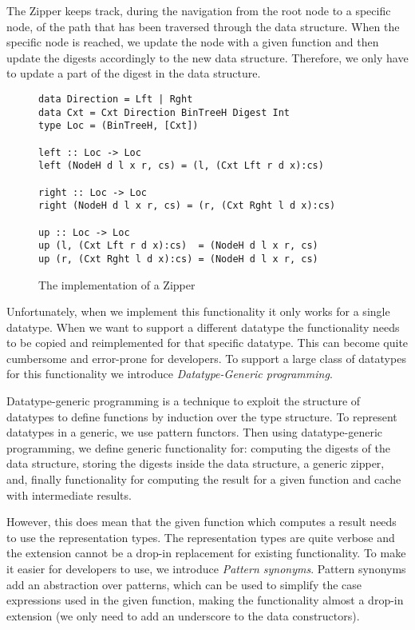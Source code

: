 The Zipper keeps track, during the navigation from the root node to a specific node, of the path that has been traversed through the data structure. When the specific node is reached, we update the node with a given function and then update the digests accordingly to the new data structure. Therefore, we only have to update a part of the digest in the data structure.

\begin{figure}[H]
\captionsetup{justification=justified,singlelinecheck=false,margin=0cm}
\begin{verbatim}
data Direction = Lft | Rght
data Cxt = Cxt Direction BinTreeH Digest Int
type Loc = (BinTreeH, [Cxt])

left :: Loc -> Loc
left (NodeH d l x r, cs) = (l, (Cxt Lft r d x):cs)

right :: Loc -> Loc
right (NodeH d l x r, cs) = (r, (Cxt Rght l d x):cs)

up :: Loc -> Loc
up (l, (Cxt Lft r d x):cs)  = (NodeH d l x r, cs)
up (r, (Cxt Rght l d x):cs) = (NodeH d l x r, cs)
\end{verbatim}
\caption{The implementation of a Zipper}
\label{<label>}
\end{figure}

Unfortunately, when we implement this functionality it only works for a single datatype. When we want to support a different datatype the functionality needs to be copied and reimplemented for that specific datatype. This can become quite cumbersome and error-prone for developers. To support a large class of datatypes for this functionality we introduce \textit{Datatype-Generic programming}.

Datatype-generic programming is a technique to exploit the structure of datatypes to define functions by induction over the type structure. To represent datatypes in a generic, we use pattern functors. Then using datatype-generic programming, we define generic functionality for: computing the digests of the data structure, storing the digests inside the data structure, a generic zipper, and, finally functionality for computing the result for a given function and cache with intermediate results. 

However, this does mean that the given function which computes a result needs to use the representation types. The representation types are quite verbose and the extension cannot be a drop-in replacement for existing functionality. To make it easier for developers to use, we introduce \textit{Pattern synonyms}\cite*{pickering2016pattern}. Pattern synonyms add an abstraction over patterns, which can be used to simplify the case expressions used in the given function, making the functionality almost a drop-in extension (we only need to add an underscore to the data constructors). 

